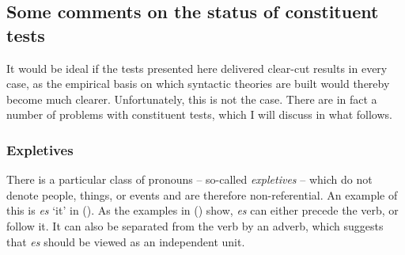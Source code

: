 {\subsection{Some comments on the status of constituent tests}
\label{sec-status-der-ktests}

It would be ideal if the tests presented here delivered clear-cut results in every case, as the empirical
basis on which syntactic theories are built would thereby become much clearer. Unfortunately, this is not the case.
There are in fact a number of problems with constituent tests, which I will discuss in what follows.

\subsubsection{Expletives}

There is a particular class of pronouns -- so-called \emph{expletives} -- which do not denote
people, things, or events and are therefore non-referential. An example of this is \emph{es} `it' in ().
\eal
{}
\zl
As the examples in () show, \emph{es} can either precede the verb, or follow it. It can also be separated from the verb
by an adverb, which suggests that \emph{es} should be viewed as an independent unit.

}
